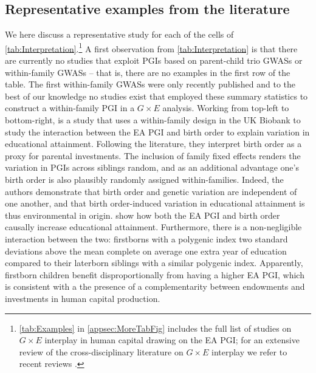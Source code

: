 \documentclass[12pt,a4paper]{article}
\begin{document}
\begin{bibunit}
\clearpage
\renewcommand{\thetable}{D.\arabic{table}}
\renewcommand{\thefigure}{D.\arabic{figure}}
\renewcommand{\theequation}{D.\arabic{equation}}
\setcounter{table}{0} 
\setcounter{figure}{0} 
\setcounter{equation}{0} 

\section{Representative examples from the literature} \label{sec:litreview}
We here discuss a representative study for each of the cells of  \autoref{tab:Interpretation}.\footnote{ \autoref{tab:Examples} in \autoref{appsec:MoreTabFig} includes the full list of studies on $G \times E$ interplay in human capital drawing on the EA PGI; for an extensive review of the cross-disciplinary literature on $G \times E$ interplay we refer to recent reviews \citep{domingue2020interactions,DiasPereira2022}.} 
A first observation from  \autoref{tab:Interpretation} is that there are currently no studies that exploit PGIs based on parent-child trio GWASs or within-family GWASs -- that is, there are no examples in the first row of the table. The first within-family GWASs \citep{Howe2022,Tan2024} were only recently published and to the best of our knowledge no studies exist that employed these summary statistics to construct a within-family PGI in a $G \times E$ analysis. Working from top-left to bottom-right, \citet{Muslimova2020b} is a study that uses a within-family design in the UK Biobank to study the interaction between the EA PGI and birth order to explain variation in educational attainment. Following the literature, they interpret birth order as a proxy for parental investments. The inclusion of family fixed effects renders the variation in PGIs across siblings random, and as an additional advantage one's birth order is also plausibly randomly assigned within-families. Indeed, the authors demonstrate that birth order and genetic variation are independent of one another, and that birth order-induced variation in educational attainment is thus environmental in origin. \citet{Muslimova2020b} show how both the EA PGI and birth order causally increase educational attainment. Furthermore, there is a non-negligible interaction between the two: firstborns with a polygenic index two standard deviations above the mean complete on average one extra year of education compared to their laterborn siblings with a similar polygenic index. Apparently, firstborn children benefit disproportionally from having a higher EA PGI, which is consistent with a the presence of a complementarity between endowments and investments in human capital production. 


\end{bibunit}
\end{document}
